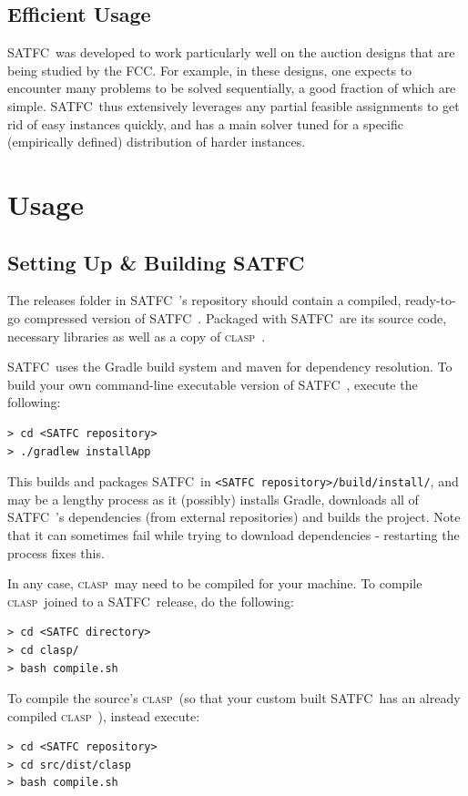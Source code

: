 \documentclass[
10pt, %
letterpaper, %
oneside, %
headinclude,footinclude, %
BCOR5mm, %
needspace, %
]{scrartcl}
\newcommand{\SATFC}{\textsc{SATFC}~}
\newcommand{\clasp}{\textsc{clasp}~}
\begin{document}
\subsection{Efficient Usage}
\SATFC was developed to work particularly well on the auction designs that are being studied by the FCC. For example, in these designs, one expects to encounter many problems to be solved sequentially, a good fraction of which are simple. \SATFC thus extensively leverages any partial feasible assignments to get rid of easy instances quickly, and has a main solver tuned for a specific (empirically defined) distribution of harder instances.

\section{Usage}\label{sec:usage}

\subsection{Setting Up \& Building \SATFC}

The releases folder in \SATFC's repository should contain a compiled, ready-to-go compressed version of \SATFC. Packaged with \SATFC are its source code, necessary libraries as well as a copy of \clasp. 

\SATFC uses the Gradle build system and maven for dependency resolution. To build your own command-line executable version of \SATFC, execute the following:
\begin{lstlisting}[style=Bash]
> cd <SATFC repository>
> ./gradlew installApp
\end{lstlisting}
This builds and packages \SATFC in \texttt{<SATFC repository>/build/install/}, and may be a lengthy process as it (possibly) installs Gradle, downloads all of \SATFC's dependencies (from external repositories) and builds the project. Note that it can sometimes fail while trying to download dependencies - restarting the process fixes this.

In any case, \clasp may need to be compiled for your machine. To compile \clasp joined to a \SATFC release, do the following:
\begin{lstlisting}[style=Bash]
> cd <SATFC directory>
> cd clasp/
> bash compile.sh
\end{lstlisting}
To compile the source's \clasp (so that your custom built \SATFC has an already compiled \clasp), instead execute:
\begin{lstlisting}[style=Bash]
> cd <SATFC repository>
> cd src/dist/clasp
> bash compile.sh
\end{lstlisting}
\end{document}
